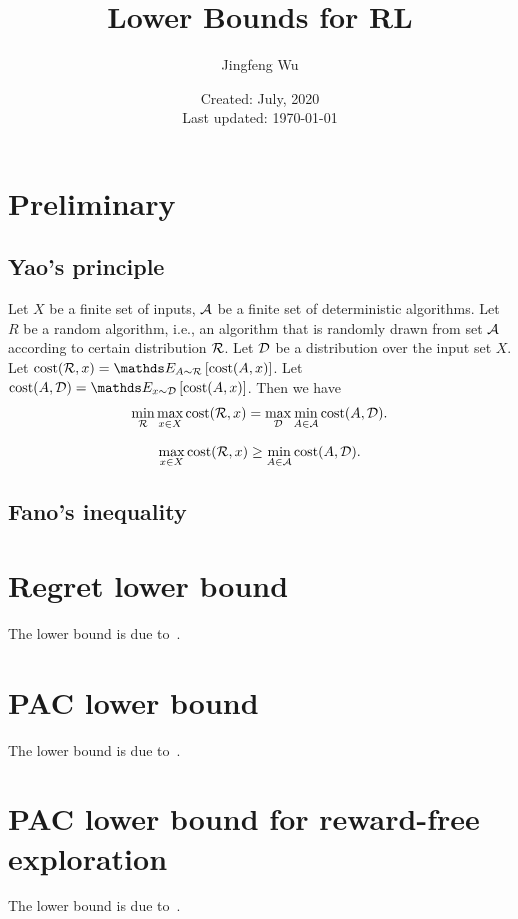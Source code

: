 \documentclass{article}
\title{Lower Bounds for RL}
\author{Jingfeng Wu}
\date{Created: July, 2020\\ Last updated: \today}
\begin{document}
\maketitle

\section{Preliminary}
\subsection{Yao's principle}

\begin{thm}
Let $X$ be a finite set of inputs, $\mathcal{A}$ be a finite set of deterministic algorithms. Let $R$ be a random algorithm, i.e., an algorithm that is randomly drawn from set $\mathcal{A}$ according to certain distribution $\mathcal{R}$. Let $\mathcal{D}$ be a distribution over the input set $X$.
Let $\cost(\Rcal, x) = \expect[A\sim \Rcal]{\cost(A,x)}$.
Let $\cost(A, \Dcal) = \expect[x\sim \Dcal]{\cost(A,x)}$.
Then we have
\begin{align*}
    \min_{\mathcal{R}} \max_{x\in X} \mathrm{cost}(\mathcal{R}, x) = \max_{\mathcal{D}} \min_{A\in\mathcal{A}} \mathrm{cost} (A, \mathcal{D}).
\end{align*}
\end{thm}
\begin{cor}
    \begin{align*}
        \max_{x\in X} \mathrm{cost}(\mathcal{R}, x) \ge \min_{A\in\mathcal{A}} \mathrm{cost} (A, \mathcal{D}).
    \end{align*}
\end{cor}

\subsection{Fano's inequality}

\section{Regret lower bound}
The lower bound is due to~\citep{auer2009near}.


\section{PAC lower bound}
The lower bound is due to~\citep{azar2013minimax}.

\section{PAC lower bound for reward-free exploration}
The lower bound is due to~\citep{jin2020reward}.




\end{document}
